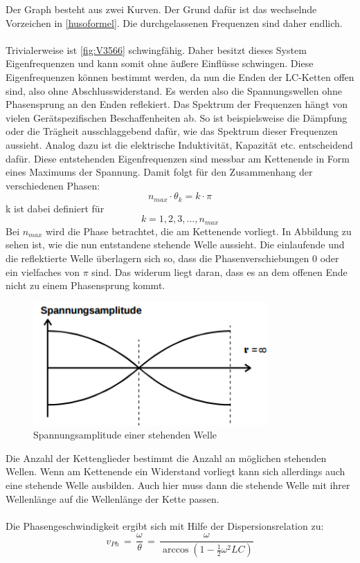 \documentclass[
  bibliography=totoc,     %
  captions=tableheading,  %
  titlepage=firstiscover, %
]{scrartcl}
\begin{document}
Der Graph besteht aus zwei Kurven. Der Grund dafür ist das wechselnde Vorzeichen
in \ref{husoformel}. Die durchgelassenen Frequenzen sind daher endlich.\\
\\
Trivialerweise ist \ref{fig:V3566} schwingfähig. Daher besitzt dieses System
Eigenfrequenzen und kann somit ohne äußere Einflüsse schwingen. Diese
Eigenfrequenzen können bestimmt werden, da nun die Enden der LC-Ketten offen
sind, also ohne Abschlusswiderstand. Es werden also die Spannungswellen
ohne Phasensprung an den Enden reflekiert. Das Spektrum der Frequenzen hängt
von vielen Gerätspezifischen Beschaffenheiten ab. So ist beispielsweise
die Dämpfung oder die Trägheit ausschlaggebend dafür, wie das Spektrum dieser
Frequenzen aussieht. Analog dazu ist die elektrische Induktivität, Kapazität etc.
entscheidend dafür. Diese entstehenden Eigenfrequenzen sind messbar am
Kettenende in Form eines Maximums der Spannung. Damit folgt für den
Zusammenhang der verschiedenen Phasen:
\begin{equation}
  n_{max}\cdot\theta_k=k\cdot\pi
\end{equation}
k ist dabei definiert für
\begin{equation}
  k=1,2,3,...,n_{max}
\end{equation}
Bei $n_{max}$ wird die Phase betrachtet, die am Kettenende vorliegt. In
Abbildung zu sehen ist, wie die nun entstandene stehende Welle aussieht. Die
einlaufende und die reflektierte Welle überlagern sich so, dass die
Phasenverschiebungen 0 oder ein vielfaches von $\pi$ sind. Das widerum liegt
daran, dass es an dem offenen Ende nicht zu einem Phasensprung kommt.
\begin{figure}[htb]
  \centering
  \includegraphics[width=0.8\textwidth]{V3567.png}
  \caption{Spannungsamplitude einer stehenden Welle}
  \label{fig:V3567}
\end{figure}
Die Anzahl der Kettenglieder bestimmt die Anzahl an möglichen stehenden Wellen.
Wenn am Kettenende ein Widerstand vorliegt kann sich allerdings auch eine stehende
Welle ausbilden. Auch hier muss dann die stehende Welle mit ihrer Wellenlänge auf
die Wellenlänge der Kette passen. \\
\\
Die Phasengeschwindigkeit ergibt sich mit Hilfe der Dispersionsrelation zu:
\begin{equation}
  v_{Ph}\,=\,\frac{\omega}{\theta}\,=\,\frac{\omega}{\arccos(1-\frac{1}{2}\omega^2LC)}
\end{equation}
\end{document}

